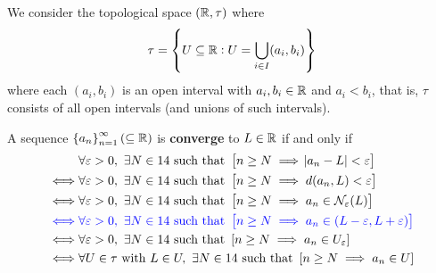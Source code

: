 \documentclass[11pt,openany]{article}
\begin{document}
\begin{note}
	We consider the topological space 
	$(\mathbb{R},\tau)$ where \[
	\tau=\set{U\subseteq\mathbb{R}:U=\bigcup_{i\in I}(a_i,b_i)}
	\] where each $(a_i,b_i)$ is an open interval with $a_i,b_i\in\mathbb{R}$ and $a_i<b_i$, that is, $\tau$ consists of all open intervals (and unions of such intervals).\par
	A sequence $\set{a_n}_{n=1}^\infty(\subseteq\mathbb{R})$ is \textbf{converge} to $L\in\mathbb{R}$ if and only if 
	\begin{align*}
	&\forall\varepsilon>0,\ \exists N\in\N\ \text{such that}\ \left[ n\geq N\implies \abs{a_n-L}<\varepsilon\right]\\
	\iff&\forall\varepsilon>0,\ \exists N\in\N\ \text{such that}\ \left[ n\geq N\implies d(a_n,L)<\varepsilon\right]\\
	\iff&\forall\varepsilon>0,\ \exists N\in\N\ \text{such that}\ \left[ n\geq N\implies a_n\in\nbhd_\varepsilon (L)\right]\\
	\color{blue}\iff&\color{blue}\forall\varepsilon>0,\ \exists N\in\N\ \text{such that}\ \left[ n\geq N\implies a_n\in(L-\varepsilon,L+\varepsilon)\right]\\
	\iff&\forall\varepsilon>0,\ \exists N\in\N\ \text{such that}\ \left[ n\geq N\implies a_n\in U_\varepsilon\right] \\
	\iff&\forall U\in\tau\ \text{with}\ L\in U,\ \exists N\in\N\ \text{such that}\ \left[ n\geq N\implies a_n\in U\right]
	\end{align*}
\begin{center}
\end{center}
\end{note}
\end{document}
